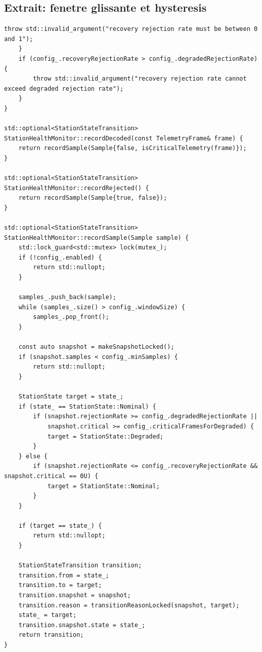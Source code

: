 \documentclass[10pt,a4paper]{article}
\begin{document}
\subsection{Extrait: fenetre glissante et hysteresis}
\begin{lstlisting}[caption={Changement d etat NOMINAL / DEGRADED}]
        throw std::invalid_argument("recovery rejection rate must be between 0 and 1");
    }
    if (config_.recoveryRejectionRate > config_.degradedRejectionRate) {
        throw std::invalid_argument("recovery rejection rate cannot exceed degraded rejection rate");
    }
}

std::optional<StationStateTransition> StationHealthMonitor::recordDecoded(const TelemetryFrame& frame) {
    return recordSample(Sample{false, isCriticalTelemetry(frame)});
}

std::optional<StationStateTransition> StationHealthMonitor::recordRejected() {
    return recordSample(Sample{true, false});
}

std::optional<StationStateTransition> StationHealthMonitor::recordSample(Sample sample) {
    std::lock_guard<std::mutex> lock(mutex_);
    if (!config_.enabled) {
        return std::nullopt;
    }

    samples_.push_back(sample);
    while (samples_.size() > config_.windowSize) {
        samples_.pop_front();
    }

    const auto snapshot = makeSnapshotLocked();
    if (snapshot.samples < config_.minSamples) {
        return std::nullopt;
    }

    StationState target = state_;
    if (state_ == StationState::Nominal) {
        if (snapshot.rejectionRate >= config_.degradedRejectionRate ||
            snapshot.critical >= config_.criticalFramesForDegraded) {
            target = StationState::Degraded;
        }
    } else {
        if (snapshot.rejectionRate <= config_.recoveryRejectionRate && snapshot.critical == 0U) {
            target = StationState::Nominal;
        }
    }

    if (target == state_) {
        return std::nullopt;
    }

    StationStateTransition transition;
    transition.from = state_;
    transition.to = target;
    transition.snapshot = snapshot;
    transition.reason = transitionReasonLocked(snapshot, target);
    state_ = target;
    transition.snapshot.state = state_;
    return transition;
}

\end{lstlisting}
\end{document}
